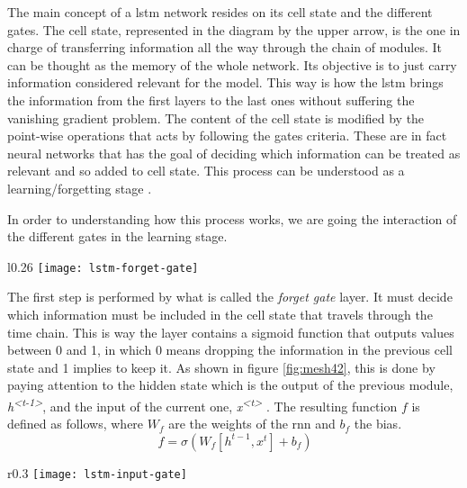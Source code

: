 	The main concept of a \acrshort{lstm} network resides on its cell state and the different gates. The cell state, represented in the diagram by the upper arrow, is the one in charge of transferring information all the way through the chain of modules. It can be thought as the memory of the whole network. Its objective is to just carry information considered relevant for the model. This way is how the \acrshort{lstm} brings the information from the first layers to the last ones without suffering the vanishing gradient problem. The content of the cell state is modified by the point-wise operations that acts by following the gates criteria. These are in fact neural networks that has the goal of deciding which information can be treated as relevant and so added to cell state. This process can be understood as a learning/forgetting stage \cite{Nguyen2018}. 
	
	In order to understanding how this process works, we are going the interaction of the different gates in the learning stage.

	\begin{wrapfigure}{l}{0.26\textwidth}
		\centering
		\captionsetup{justification=centering}
		\texttt{[image: lstm-forget-gate]}
		\caption{Step 1. Forget gate}
		\label{fig:mesh42}
	\end{wrapfigure}

	The first step is performed by what is called the \textit{forget gate} layer. It must decide which information must be included in the cell state that travels through the time chain. This is way the layer contains a sigmoid function that outputs values between  0 and 1, in which  0 means dropping the information in the previous cell state and 1 implies to keep it. As shown in figure \ref{fig:mesh42}, this is done by paying attention to the hidden state which is the output of the previous module, \textit{h\textsuperscript{<t-1>}}, and the input of the current one, \textit{x\textsuperscript{<t>}} \cite{Nguyen2018}. The resulting function $f$ is defined as follows, where $W_{f}$ are the weights of the \acrshort{rnn} and $b_{f}$ the bias.
	\[
	\ f = \sigma(W_{f}[h^{t-1}, x^{t}] + b_{f})
	\]
	
	\begin{wrapfigure}{r}{0.3\textwidth}
		\centering
		\captionsetup{justification=centering}
		\texttt{[image: lstm-input-gate]}
		\caption{Step 2. Input gate}
		\label{fig:mesh43}
	\end{wrapfigure}
	
